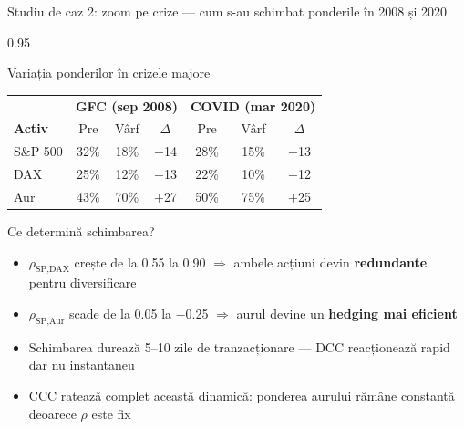 \documentclass[9pt, aspectratio=169, t]{beamer}
\begin{document}
\begin{frame}{Studiu de caz 2: zoom pe crize --- cum s-au schimbat ponderile în 2008 și 2020}
    \begin{cminipage}{0.95\textwidth}
    {\footnotesize
    \begin{block}{Variația ponderilor în crizele majore}
        \vspace{0.1cm}
        {\small
        \begin{center}
        \begin{tabular}{l|ccc|ccc}
            \hline
            & \multicolumn{3}{c|}{\textbf{GFC (sep 2008)}} & \multicolumn{3}{c}{\textbf{COVID (mar 2020)}} \\
            \textbf{Activ} & Pre & Vârf & $\Delta$ & Pre & Vârf & $\Delta$ \\
            \hline
            S\&P 500 & 32\% & 18\% & $-$14 & 28\% & 15\% & $-$13 \\
            DAX      & 25\% & 12\% & $-$13 & 22\% & 10\% & $-$12 \\
            Aur      & 43\% & 70\% & $+$27 & 50\% & 75\% & $+$25 \\
            \hline
        \end{tabular}
        \end{center}
        }
    \end{block}
    \begin{alertblock}{Ce determină schimbarea?}
        \begin{itemize}\setlength{\itemsep}{0pt}
            \item $\rho_{\text{SP,DAX}}$ crește de la 0.55 la 0.90 $\Rightarrow$ ambele acțiuni devin \textbf{redundante} pentru diversificare
            \item $\rho_{\text{SP,Aur}}$ scade de la 0.05 la $-$0.25 $\Rightarrow$ aurul devine un \textbf{hedging mai eficient}
            \item Schimbarea durează 5--10 zile de tranzacționare --- DCC reacționează rapid dar nu instantaneu
            \item CCC ratează complet această dinamică: ponderea aurului rămâne constantă deoarece $\rho$ este fix
        \end{itemize}
    \end{alertblock}
    }
    \end{cminipage}
\end{frame}
\end{document}
